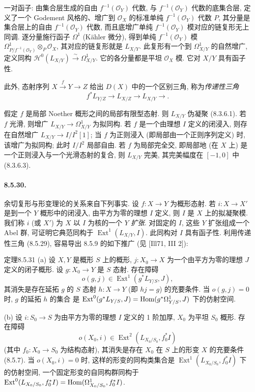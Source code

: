一对函子: 由集合层生成的自由 $f^{-1}(\mathcal O_Y)$ 代数, 与 $f^{-1}(\mathcal O_Y)$ 代数的底集合层, 定义了一个 Godement 风格的、增广到 $\mathcal O_X$ 的标准单纯 $f^{-1}(\mathcal O_Y)$ 代数 $P$, 其分量是集合层上的自由 $f^{-1}(\mathcal O_Y)$ 代数, 而且底增广单纯 $f^{-1}(\mathcal O_Y)$ 模对应的链复形无上同调. 逐分量施行函子 $\Omega^1$ (Kähler 微分), 得到单纯 $f^{-1}(\mathcal O_Y)$ 模 $\Omega^1_{P/f^{-1}(\mathcal O_Y)}\otimes_P\mathcal O_X$, 其对应的链复形就是 $L_{X/Y}$. 此复形有一个到 $\Omega^1_{X/Y}$ 的自然增广, 定义同构 $\mathcal H^0(L_{X/Y})\xrightarrow\sim\Omega^1_{X/Y}$. 它的各分量都是平坦 $\mathcal O_X$ 模. 它对 $X/Y$ 具有函子性.

此外, 态射序列 $X\xrightarrow{f}Y\to Z$ 给出 $D(X)$ 中的一个区别三角, 称为\emph{传递性三角}
\[f^*L_{Y/Z}\longrightarrow L_{X/Z}\longrightarrow L_{X/Y}\longrightarrow.\]

假定 $f$ 是局部 Noether 概形之间的局部有限型态射. 则 $L_{X/Y}$ 伪凝聚 (8.3.6.1). 若 $f$ 光滑, 则增广 $L_{X/Y}\to\Omega^1_{X/Y}$ 为拟同构. 若 $f$ 是一个由理想 $I$ 定义的闭浸入, 则存在自然增广 $L_{X/Y}\to I/I^2[1]$; 当 $f$ 为正则浸入 (即局部由一个正则序列定义) 时, 该增广为拟同构; 此时 $I/I^2$ 局部自由. 若 $f$ 为局部完全交, 即局部地 (在 $X$ 上) 是一个正则浸入与一个光滑态射的复合, 则 $L_{X/Y}$ 完美, 其完美幅度在 $[-1,0]$ 中 (8.3.6.3).

\paragraph{8.5.30.}
余切复形与形变理论的关系来自下列事实. 设 $f:X\to Y$ 为概形态射. 若 $i:X\to X'$ 是到一个 $Y$ 概形中的闭浸入, 由平方为零的理想 $I$ 定义, 则 $I$ 是 $X$ 上的拟凝聚模. 我们称 $i$ (或 $X'$) 为 $X$ 以 $I$ 为核的一个 $Y$ \emph{扩张}. 对固定的 $I$, 这些 $Y$ 扩张组成一个 Abel 群, 可证明它典范同构于 $\operatorname{Ext}^1(L_{X/Y},I)$. 此同构对 $I$ 具有函子性. 利用传递性三角 (8.5.29), 容易导出 8.5.9 的如下推广 (见 [Ill71, III 2]):

\begin{origstatement}{定理}{8.5.31}\label{ch08:th8531}
(a) 设 $X,Y$ 是概形 $S$ 上的概形, $j:X_0\to X$ 为一个由平方为零的理想 $J$ 定义的闭子概形. 设 $g:X_0\to Y$ 是 $S$ 态射. 存在障碍
\[o(g,j)\in\operatorname{Ext}^1(g^*L_{Y/S},J),\]
其消失是存在延拓 $g$ 的 $S$ 态射 $h:X\to Y$ (即 $hj=g$) 的充要条件. 当 $o(g,j)=0$ 时, $g$ 的延拓 $h$ 的集合
是 $\operatorname{Ext}^0(g^*L_{Y/S},J)=\operatorname{Hom}(g^*\Omega^1_{Y/S},J)$ 下的仿射空间.

(b) 设 $i:S_0\to S$ 为由平方为零的理想 $I$ 定义的 1 阶加厚, $X_0$ 为平坦 $S_0$ 概形. 存在障碍
\[o(X_0,i)\in\operatorname{Ext}^2(L_{X_0/S_0},f_0^*I)\]
(其中 $f_0:X_0\to S_0$ 为结构态射), 其消失是存在 $X_0$ 在 $S$ 上的形变 $X$ 的充要条件 (8.5.7). 当 $o(X_0,i)=0$ 时, 这样的形变的同构类集合是 $\operatorname{Ext}^1(L_{X_0/S_0},f_0^*I)$ 下的仿射空间, 一个固定形变的自同构群同构于 $\operatorname{Ext}^0(L_{X_0/S_0},f_0^*I)=\operatorname{Hom}(\Omega^1_{X_0/S_0},f_0^*I)$.
\end{origstatement}

